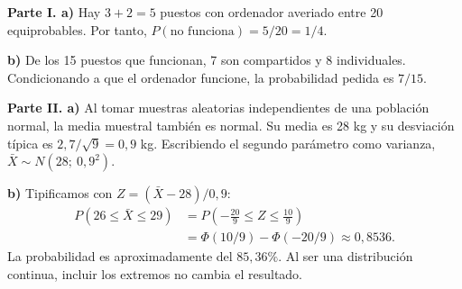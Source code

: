 \textbf{Parte I. a)} Hay $3+2=5$ puestos con ordenador averiado entre 20 equiprobables. Por tanto, $P(\text{no funciona})=5/20=\boxed{1/4}$.

\textbf{b)} De los 15 puestos que funcionan, 7 son compartidos y 8 individuales. Condicionando a que el ordenador funcione, la probabilidad pedida es $\boxed{7/15}$.

\textbf{Parte II. a)} Al tomar muestras aleatorias independientes de una población normal, la media muestral también es normal. Su media es 28 kg y su desviación típica es $2{,}7/\sqrt9=0{,}9$ kg. Escribiendo el segundo parámetro como varianza, $\bar X\sim N(28;\ 0{,}9^2)$.

\textbf{b)} Tipificamos con $Z=(\bar X-28)/0{,}9$:
\[
 \begin{aligned}
 P(26\le\bar X\le29)
 &=P\left(-\frac{20}{9}\le Z\le\frac{10}{9}\right)\\
 &=\Phi(10/9)-\Phi(-20/9)\approx\boxed{0{,}8536}.
 \end{aligned}
\]
La probabilidad es aproximadamente del $85{,}36\%$. Al ser una distribución continua, incluir los extremos no cambia el resultado.
